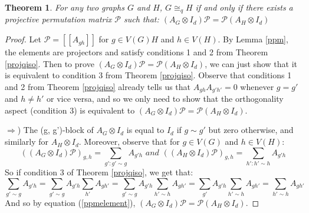 \documentclass[12pt]{article}
\newtheorem{thm}{Theorem}[section]
\begin{document}
\begin{thm}
For any two graphs $G$ and $H$, $G \cong_q H$ if and only if there exists a projective permutation matrix $\mathcal{P}$ such that: $(A_G \otimes I_d)\mathcal{P} = \mathcal{P} (A_H \otimes I_d)$
\end{thm}
\begin{proof}
Let $\mathcal{P} = [[A_{gh}]]$ for $g \in V(G)H$ and $h \in V(H)$. By Lemma \ref{ppm}, the elements are projectors and satisfy conditions 1 and 2 from Theorem \ref{projqiso}. Then to prove $(A_G \otimes I_d)\mathcal{P} = \mathcal{P} (A_H \otimes I_d)$, we can just show that it is equivalent to condition 3 from Theorem \ref{projqiso}. Observe that conditions 1 and 2 from Theorem \ref{projqiso} already tells us that $A_{gh}A_{g'h'} = 0$ whenever $g = g'$ and $h \neq h'$ or vice versa, and so we only need to show that the orthogonality aspect (condition 3) is equivalent to $(A_G \otimes I_d)\mathcal{P} = \mathcal{P} (A_H \otimes I_d)$. 

$\Rightarrow$) The (g, g')-block of $A_G \otimes I_d$ is equal to $I_d$ if $g \sim g'$ but zero otherwise, and similarly for $A_H \otimes I_d$. Moreover, observe that for $g \in V(G)$ and $h \in V(H)$:
\begin{equation}
\label{ppmelement}
((A_G \otimes I_d)\mathcal{P})_{g,h} = \sum_{g':g' \sim g} A_{g'h} \textit{  and  } ((A_H \otimes I_d)\mathcal{P})_{g,h} = \sum_{h':h' \sim h} A_{g'h}
\end{equation} 
So if condition 3 of Theorem \ref{projqiso}, we get that:
\begin{equation}
\sum_{g' \sim g} A_{g'h} = \sum_{g' \sim g} A_{g'h} \sum_{h'} A_{gh'} = \sum_{g' \sim g} A_{g'h} \sum_{h' \sim h} A_{gh'} = \sum_{g'} A_{g'h} \sum_{h' \sim h} A_{gh'} = \sum_{h' \sim h} A_{gh'}
\end{equation}
And so by equation (\ref{ppmelement}), $(A_G \otimes I_d)\mathcal{P} = \mathcal{P} (A_H \otimes I_d)$.


\end{proof}
\end{document}
